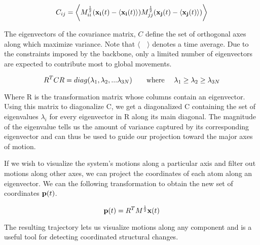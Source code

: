 \begin{equation}
C_{ij} = \bigg\langle M_{ii}^{\frac{1}{2}} (\mathbf{x_i}(t) - \langle \mathbf{x_i}(t) \rangle) M_{jj}^{\frac{1}{2}} (\mathbf{x_j}(t) - \langle \mathbf{x_j}(t) \rangle) \bigg\rangle
\end{equation}

The eigenvectors of the covariance matrix, $C$ define the set of orthogonal axes along which maximize variance. Note that $\langle \quad \rangle$ denotes a time average. Due to the constraints imposed by the backbone, only a limited number of eigenvectors are expected to contribute most to global movements.

\begin{equation}
R^{T}CR = diag(\lambda_1, \lambda_2, ... \lambda_{3N}) \text{\qquad where \quad} \lambda_1 \geq \lambda_2 \geq \lambda_{3N}
\end{equation}

Where R is the transformation matrix whose columns contain an eigenvector. Using this matrix to diagonalize C, we get a diagonalized C containing the set of eigenvalues $\lambda_i$ for every eigenvector in R along its main diagonal. The magnitude of the eigenvalue tells us the amount of variance captured by its corresponding eigenvector and can thus be used to guide our projection toward the major axes of motion.

If we wish to visualize the system's motions along a particular axis and filter out motions along other axes, we can project the coordinates of each atom along an eigenvector. We can the following transformation to obtain the new set of coordinates $\mathbf{p}(t)$.

\begin{equation}
\mathbf{p}(t) = R^{T}M^{\frac{1}{2}}\mathbf{x}(t)
\end{equation}

The resulting trajectory lets us visualize motions along any component and is a useful tool for detecting coordinated structural changes. 

%
%
%


